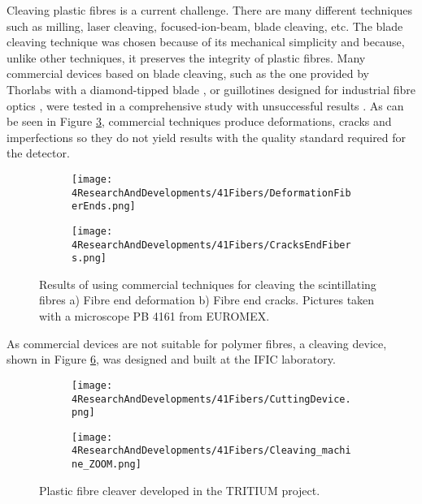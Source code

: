 Cleaving plastic fibres is a current challenge. There are many different techniques such as milling, laser cleaving, focused-ion-beam, blade cleaving, etc. The blade cleaving technique was chosen because of its mechanical simplicity and because, unlike other techniques, it preserves the integrity of plastic fibres. Many commercial devices based on blade cleaving, such as the one provided by Thorlabs with a diamond-tipped blade \cite{DiamondThorlabs}, or guillotines designed for industrial fibre optics \cite{GuillotineIFO}, were tested in a comprehensive study with unsuccessful results \cite{TFGAlberto}. As can be seen in Figure \ref{fig:BadCleavesOfFibers}, commercial techniques produce deformations, cracks and imperfections so they do not yield results with the quality standard required for the detector.
\begin{figure}
\centering
    \begin{subfigure}[b]{0.5\textwidth}
    \centering
    \texttt{[image: 4ResearchAndDevelopments/41Fibers/DeformationFiberEnds.png]}  
    \caption{\label{subfig:FiberEndDeformation}}
    \end{subfigure}
    \hfill
    \begin{subfigure}[b]{0.45\textwidth}
    \centering
    \texttt{[image: 4ResearchAndDevelopments/41Fibers/CracksEndFibers.png]}  
    \caption{\label{subfig:FiberEndCracks}}
    \end{subfigure}
 \caption{Results of using commercial techniques for cleaving the scintillating fibres a) Fibre end deformation b) Fibre end cracks. Pictures taken with a microscope PB 4161 from EUROMEX.}
 \label{fig:BadCleavesOfFibers}
\end{figure}
As commercial devices are not suitable for polymer fibres, a cleaving device, shown in Figure \ref{fig:CleaveTRITIUMDevice}, was designed and built at the IFIC laboratory.
\begin{figure}
\centering
    \begin{subfigure}[b]{0.5\textwidth}
    \centering
    \texttt{[image: 4ResearchAndDevelopments/41Fibers/CuttingDevice.png]}  
    \caption{\label{subfig:CleaveTRITIUMDevice1}}
    \end{subfigure}
    \hfill
    \begin{subfigure}[b]{0.45\textwidth}
    \centering
    \texttt{[image: 4ResearchAndDevelopments/41Fibers/Cleaving\_machine\_ZOOM.png]}  
    \caption{\label{subfig:CleaveTRITIUMDeviceZOOM}}
    \end{subfigure}
 \caption{Plastic fibre cleaver developed in the TRITIUM project. \label{fig:CleaveTRITIUMDevice}}
\end{figure}
